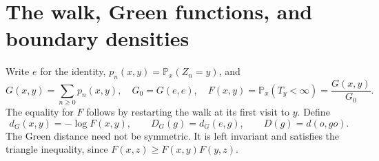 \documentclass[11pt,a4paper]{article}
\newcommand{\DG}{D_G}
\newcommand{\dG}{d_G}
\theoremstyle{definition}
\theoremstyle{remark}
\numberwithin{equation}{section}
\begin{document}
\section{The walk, Green functions, and boundary densities}\label{sec:prelim}
Write $e$ for the identity, $p_n(x,y)=\mathbb P_x(Z_n=y)$, and
\begin{equation}\label{eq:green}
 G(x,y)=\sum_{n\ge0}p_n(x,y),\quad G_0=G(e,e),\quad
 F(x,y)=\mathbb P_x(T_y<\infty)=\frac{G(x,y)}{G_0}.
\end{equation}
The equality for $F$ follows by restarting the walk at its first visit to
$y$. Define
\[
 \dG(x,y)=-\log F(x,y),\qquad \DG(g)=\dG(e,g),\qquad D(g)=d(o,go).
\]
The Green distance need not be symmetric. It is left invariant and satisfies
the triangle inequality, since $F(x,z)\ge F(x,y)F(y,z)$.
\end{document}
